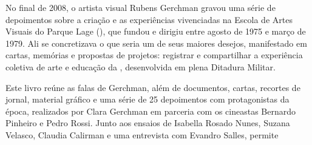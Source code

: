 \medskip

\noindent{}No final de 2008, o artista visual Rubens Gerchman gravou uma série de depoimentos sobre a criação e as experiências vivenciadas na Escola de Artes Visuais do Parque Lage (), que fundou e dirigiu entre agosto de 1975 e março de 1979. Ali se concretizava o que seria um de seus maiores desejos, manifestado em cartas, memórias e propostas de projetos: registrar e compartilhar a experiência coletiva de arte e educação da , desenvolvida em plena Ditadura Militar.

Este livro reúne as falas de Gerchman, além de documentos, cartas, recortes de jornal, material gráfico e uma série de 25 depoimentos com protagonistas da época, realizados por Clara Gerchman em parceria com os cineastas Bernardo Pinheiro e Pedro Rossi. Junto aos ensaios de Isabella Rosado Nunes, Suzana Velasco, Claudia Calirman e uma entrevista com Evandro Salles, permite 


\vfill

\hspace*{-.4cm}\begin{minipage}[c]{1\linewidth}
\small{
{}}
\end{minipage}


\pagebreak
\pagestyle{azouguecat}


